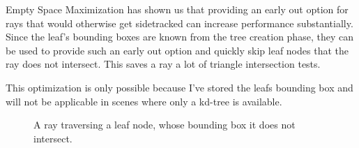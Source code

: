 
Empty Space Maximization has shown us that providing an early out option for
rays that would otherwise get sidetracked can increase performance
substantially. 
Since the leaf's bounding boxes are known from the tree creation phase, they can
be used to provide such an early out option and quickly skip leaf nodes that the
ray does not intersect. This saves a ray a lot of triangle intersection tests.

This optimization is only possible because I've stored the leafs bounding box
and will not be applicable in scenes where only a kd-tree is available. 


\begin{figure}
  \centering
  \caption{A ray traversing a leaf node, whose bounding box it does
    not intersect.}
  \label{fig:waywardRay}
\end{figure}





